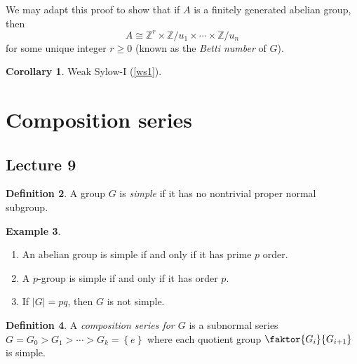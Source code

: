 \documentclass[10pt,letterpaper,cm]{nupset}
\theoremstyle{definition}
\newtheorem{definition}{Definition}[subsection]
\newtheorem{exmp}[definition]{Example}
\theoremstyle{theorem}
\newtheorem{corollary}[definition]{Corollary}
\theoremstyle{remark}
\newcommand{\Z}{\mathbb Z}
\newcommand{\1}{\mathbf{1}}
\newcommand{\0}{\vec 0}
\begin{document}
We may adapt this proof to show that if $A$ is a finitely generated abelian group, then $$A \cong \Z^r \times \Z/u_1 \times \cdots \times \Z/u_n$$ for some unique integer $r\geq 0$ (known as the \textit{Betti number} of $G$). 

\smallskip


\begin{corollary}
Weak Sylow-I (\cref{ws1}).
\end{corollary}


\section{Composition series}

\subsection{Lecture 9}

\begin{definition}
A group $G$ is \textit{simple} if it has no nontrivial proper normal subgroup.
\end{definition}

\begin{exmp} $ $
\begin{enumerate}
\item An abelian group is simple if and only if it has prime $p$ order.
\item A $p$-group is simple if and only if it has order $p$.
\item If $\left\lvert{G}\right\rvert = pq$, then $G$ is not simple.
\end{enumerate}
\end{exmp}

\begin{definition}
A \textit{composition series for $G$} is a subnormal series $G = G_0 > G_1 > \cdots > G_k = \left\{e\right\}$ where each quotient group $\faktor{G_i}{G_{i+1}}$ is simple.
\end{definition}
\end{document}
